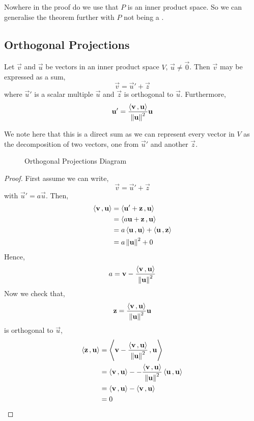 \documentclass{article}
\begin{document}
\begin{remark}
  Nowhere in the proof do we use that $P$ is an inner product space. So we can generalise the theorem further with $P$ not being a .
\end{remark}

\subsection{Orthogonal Projections}

\begin{nthm}{}
  Let $\vec v$ and $\vec u$ be vectors in an inner product space $V$, $\vec u \ne \vec 0$. Then $\vec v$ may be expressed as a sum,
  $$ \vec v = \vec u' + \vec z $$
  where $\vec u'$ is a scalar multiple $\vec u$ and $\vec z$ is orthogonal to $\vec u$. Furthermore,
  $$ \vec u' =\frac{\ip {\vec v} {\vec u}}{\norm {\vec u}^2}\vec u $$
\end{nthm}

We note here that this is a direct sum as we can represent every vector in $V$ as the decomposition of two vectors, one from $\vec u'$ and another $\vec z$.

\begin{figure}[!ht]
  \centering
  \caption{Orthogonal Projections Diagram}
  \label{fig:OrthogProj}
\end{figure}

\begin{proof}
  First assume we can write,
  $$ \vec v = \vec u' + \vec z $$
  with $\vec u' = a\vec u$. Then,
  \begin{align*}
    \ip{\vec v}{\vec u} &= \ip{\vec u' + \vec z}{\vec u}\\
    &= \ip{a\vec u + \vec z}{\vec u}\\
    &= a\ip{\vec u}{\vec u} + \ip{\vec u}{\vec z}\\
    &= a\norm{\vec u}^2 + 0\\
  \end{align*}
  Hence,
   $$ a = \vec v - \frac{\ip{\vec v}{\vec u}}{\norm{\vec u}^2} $$
  Now we check that,
  $$ \vec z = \frac{\ip{\vec v}{\vec u}}{\norm{\vec u}^2}\vec u $$
  is orthogonal to $\vec u$,
  \begin{align*}
    \ip{\vec z}{\vec u} &= \ip{\vec v - \frac{\ip{\vec v}{\vec u}}{\norm{\vec u}^2}}{\vec u}\\
    &= \ip{\vec v}{\vec u} - - \frac{\ip{\vec v}{\vec u}}{\norm{\vec u}^2}\ip{\vec u}{\vec u}\\
    &= \ip{\vec v}{\vec u} - \ip{\vec v}{\vec u}\\
    &= 0
  \end{align*}
\end{proof}
\end{document}
